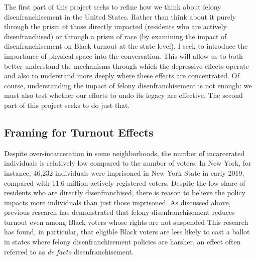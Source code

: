 \documentclass[12pt,]{article}
\begin{document}
The first part of this project seeks to refine how we think about felony disenfranchisement in the United States. Rather than think about it purely through the prism of those directly impacted (residents who are actively disenfranchised) or through a prism of race (by examining the impact of disenfranchisement on Black turnout at the state level), I seek to introduce the importance of physical space into the conversation. This will allow us to both better understand the mechanisms through which the depressive effects operate and also to understand more deeply where these effects are concentrated. Of course, understanding the impact of felony disenfranchisement is not enough: we must also test whether our efforts to undo its legacy are effective. The second part of this project seeks to do just that.

\hypertarget{framing-for-turnout-effects}{%
\subsection*{Framing for Turnout Effects}\label{framing-for-turnout-effects}}

Despite over-incarceration in some neighborhoods, the number of incarcerated individuals is relatively low compared to the number of voters. In New York, for instance, 46,232 individuals were imprisoned in New York State in early 2019, compared with 11.6 million actively registered voters. Despite the low share of residents who are directly disenfranchised, there is reason to believe the policy impacts more individuals than just those imprisoned. As discussed above, previous research has demonstrated that felony disenfranchisement reduces turnout even among Black voters whose rights are not suspended This research has found, in particular, that eligible Black voters are less likely to cast a ballot in states where felony disenfranchisement policies are harsher, an effect often referred to as \emph{de facto} disenfranchisement.
\end{document}
